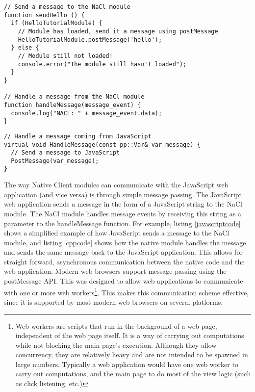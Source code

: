 \begin{lstlisting}
// Send a message to the NaCl module
function sendHello () {
  if (HelloTutorialModule) {
    // Module has loaded, send it a message using postMessage
    HelloTutorialModule.postMessage('hello');
  } else {
    // Module still not loaded!
    console.error("The module still hasn't loaded");
  }
}

// Handle a message from the NaCl module
function handleMessage(message_event) {
  console.log("NACL: " + message_event.data);
}
\end{lstlisting}


\begin{lstlisting}
// Handle a message coming from JavaScript
virtual void HandleMessage(const pp::Var& var_message) {
  // Send a message to JavaScript
  PostMessage(var_message);
}
\end{lstlisting}

The way Native Client modules can communicate with the JavaScript web application (and vice versa) is through simple message passing. The JavaScript web application sends a message in the form of a JavaScript string to the NaCl module. The NaCl module handles message events by receiving this string as a parameter to the handleMessage function. For example, listing \ref{javascriptcode} shows a simplified example of how JavaScript sends a message to the NaCl module, and listing \ref{cppcode} shows how the native module handles the message and sends the same message back to the JavaScript application. This allows for straight forward, asynchronous communication between the native code and the web application. Modern web browsers support message passing using the postMessage API. This was designed to allow web applications to communicate with one or more web workers\footnote{Web workers\cite{webworkersw3c} are scripts that run in the background of a web page, independent of the web page itself. It is a way of carrying out computations while not blocking the main page's execution. Although they allow concurrency, they are relatively heavy and are not intended to be spawned in large numbers. Typically a web application would have one web worker to carry out computations, and the main page to do most of the view logic (such as click listening, etc.)}. This makes this communication scheme effective, since it is supported by most modern web browsers on several platforms.

